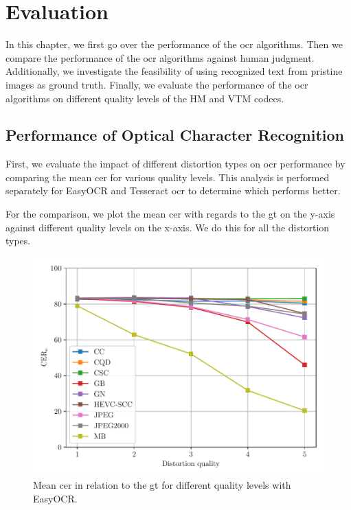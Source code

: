 \chapter{Evaluation}
\label{chap:evaluation}

In this chapter, we first go over the performance of the \gls{ocr} algorithms.
Then we compare the performance of the \gls{ocr} algorithms against human judgment.
Additionally, we investigate the feasibility of using recognized text from pristine images as ground truth.
Finally, we evaluate the performance of the \gls{ocr} algorithms on different quality levels of the HM and VTM codecs.

\section{Performance of Optical Character Recognition}
\label{sec:ocr_performance}

First, we evaluate the impact of different distortion types on \gls{ocr} performance by comparing the mean \gls{cer} for various quality levels.
This analysis is performed separately for EasyOCR and Tesseract \gls{ocr} to determine which performs better.

For the comparison, we plot the mean \gls{cer} with regards to the \gls{gt} on the y-axis against different quality levels on the x-axis.
We do this for all the distortion types.

\begin{figure}[h]
\centering
    \includegraphics[width=\textwidth]{../../images/analyze/cer_dist_quality_gt_ezocr.pdf}
    \caption{Mean \gls{cer} in relation to the \gls{gt} for different quality levels with EasyOCR.}
\label{fig:cer_dist_quality_gt_ezocr}
\end{figure}

